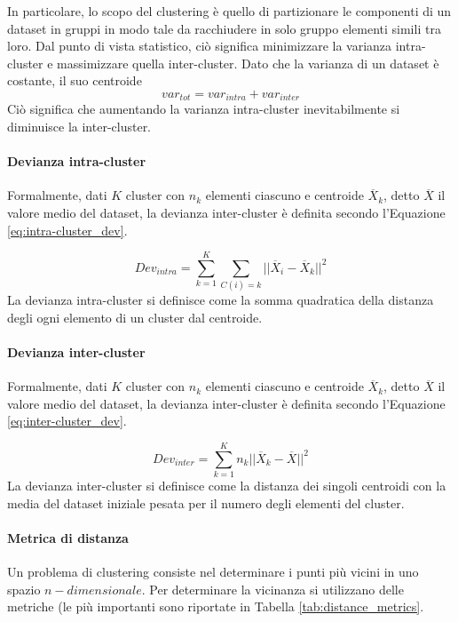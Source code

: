 \documentclass{article}
\begin{document}
In particolare, lo scopo del clustering è quello di partizionare le componenti di un dataset
in gruppi in modo tale da racchiudere in solo gruppo elementi simili tra loro. Dal punto di 
vista statistico, ciò significa minimizzare la varianza intra-cluster e massimizzare quella 
inter-cluster. Dato che la varianza di un dataset è costante, il suo centroide \begin{equation}
  var_{tot} = var_{intra} + var_{inter}
\end{equation}
Ciò significa che aumentando la varianza intra-cluster inevitabilmente si diminuisce la
inter-cluster.

\paragraph{Devianza intra-cluster} Formalmente, dati $K$ cluster con $n_k$ elementi ciascuno 
e centroide $\overline{X}_k$, detto $\overline{X}$ il valore medio del dataset, 
la devianza inter-cluster è definita secondo l'Equazione \ref{eq:intra-cluster_dev}.

\begin{equation}
  Dev_{intra} = \displaystyle\sum_{k=1}^{K} \displaystyle\sum_{C(i) = k}  
  ||\overline{X}_i - \overline{X}_k||^2 
  \label{eq:intra-cluster_dev}
\end{equation}
La devianza intra-cluster si definisce come la somma quadratica della distanza degli ogni 
elemento di un cluster dal centroide.

\paragraph{Devianza inter-cluster} Formalmente, dati $K$ cluster con $n_k$ elementi ciascuno 
e centroide $\overline{X}_k$, detto $\overline{X}$ il valore medio del dataset, 
la devianza inter-cluster è definita secondo l'Equazione \ref{eq:inter-cluster_dev}.

\begin{equation}
  Dev_{inter} = \displaystyle\sum_{k=1}^{K} n_k ||\overline{X}_k - \overline{X}||^2 
  \label{eq:inter-cluster_dev}
\end{equation}
La devianza inter-cluster si definisce come la distanza dei singoli centroidi con la media 
del dataset iniziale pesata per il numero degli elementi del cluster.

\paragraph{Metrica di distanza} Un problema di clustering consiste nel determinare i punti 
più vicini in uno spazio $n-dimensionale$. Per determinare la vicinanza si utilizzano delle
metriche (le più importanti sono riportate in Tabella \ref{tab:distance_metrics}. 
\end{document}
